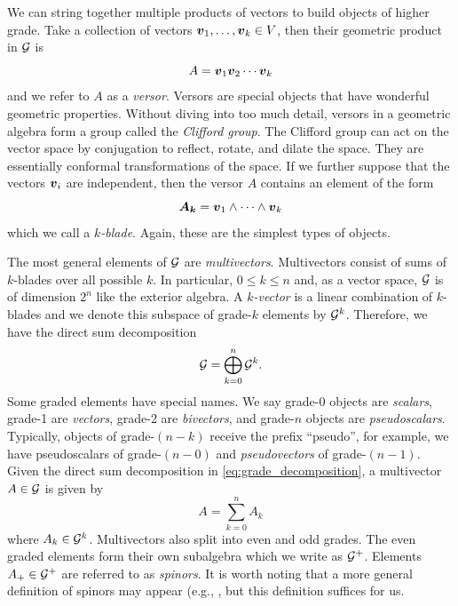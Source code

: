 \documentclass{article}
\begin{document}
We can string together multiple products of vectors to build objects of higher grade. Take a collection of vectors $\boldsymbol{v}_1,\dots,\boldsymbol{v}_k \in V$, then their geometric product in $\mathcal{G}$ is
\begin{equation}
    A = \boldsymbol{v}_1 \boldsymbol{v}_2 \cdots \boldsymbol{v}_k
\end{equation}
and we refer to $A$ as a \emph{versor}. Versors are special objects that have wonderful geometric properties. Without diving into too much detail, versors in a geometric algebra form a group called the \emph{Clifford group}. The Clifford group can act on the vector space by conjugation to reflect, rotate, and dilate the space. They are essentially conformal transformations of the space. If we further suppose that the vectors $\boldsymbol{v}_i$ are independent, then the versor $A$ contains an element of the form
\begin{equation}
    \boldsymbol{A_k} = \boldsymbol{v}_1 \wedge \cdots \wedge \boldsymbol{v}_k
\end{equation}
which we call a \emph{$k$-blade}. Again, these are the simplest types of objects. 

The most general elements of $\mathcal{G}$ are \emph{multivectors}. Multivectors consist of sums of $k$-blades over all possible $k$. In particular, $0\leq k \leq n$ and, as a vector space, $\mathcal{G}$ is of dimension $2^n$ like the exterior algebra. A \emph{$k$-vector} is a linear combination of $k$-blades and we denote this subspace of grade-$k$ elements by $\mathcal{G}^k$. Therefore, we have the direct sum decomposition
\begin{equation}
    \label{eq:grade_decomposition}
    \mathcal{G}= \bigoplus_{k=0}^n \mathcal{G}^k.
\end{equation}
Some graded elements have special names. We say grade-0 objects are \emph{scalars}, grade-1 are \emph{vectors}, grade-2 are \emph{bivectors}, and grade-$n$ objects are \emph{pseudoscalars}. Typically, objects of grade-$(n-k)$ receive the prefix ``pseudo'', for example, we have pseudoscalars of grade-$(n-0)$ and \emph{pseudovectors} of grade-$(n-1)$. Given the direct sum decomposition in \cref{eq:grade_decomposition}, a multivector $A\in \mathcal{G}$ is given by
\begin{equation}
    \label{eq:grade_decomp_of_multivector}
A = \sum_{k=0}^n A_k
\end{equation}
where $A_k \in \mathcal{G}^k$. Multivectors also split into even and odd grades. The even graded elements form their own subalgebra which we write as $\mathcal{G}^+$. Elements $A_+ \in \mathcal{G}^+$ are referred to as \emph{spinors}. It is worth noting that a more general definition of spinors may appear (e.g., , but this definition suffices for us.
\end{document}
